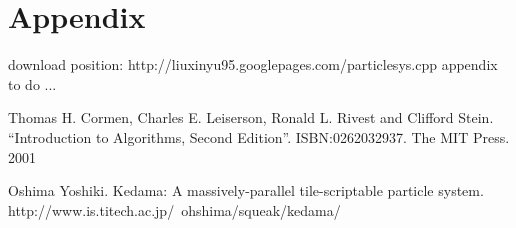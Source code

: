 \documentclass{article}
\begin{document}
\section{Appendix}
download position: http://liuxinyu95.googlepages.com/particlesys.cpp
appendix to do ...

\begin{thebibliography}{99}

Thomas H. Cormen, Charles E. Leiserson, Ronald L. Rivest and Clifford Stein. 
``Introduction to Algorithms, Second Edition''. ISBN:0262032937. The MIT Press. 2001

Oshima Yoshiki. Kedama: A massively-parallel tile-scriptable particle system. http://www.is.titech.ac.jp/~ohshima/squeak/kedama/

\end{thebibliography}

\ifx\wholebook\relax\else
\end{document}
